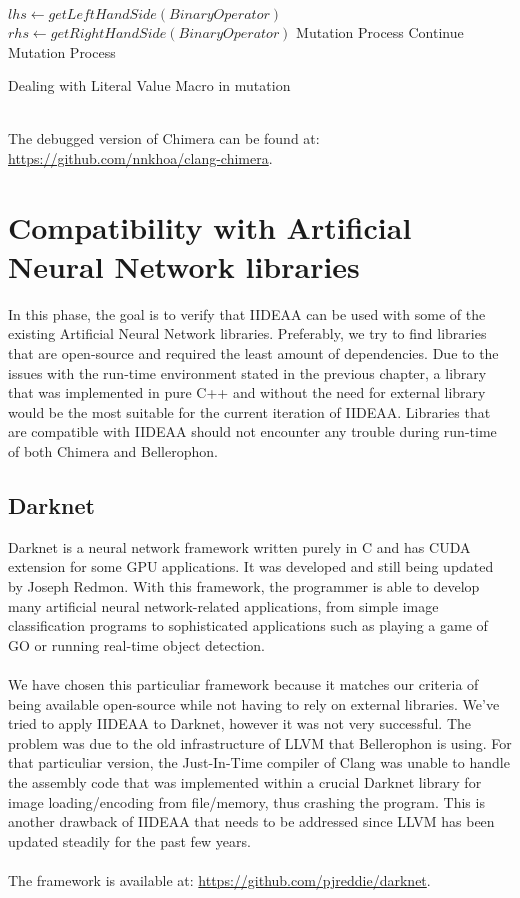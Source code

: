 \begin{algorithm}[H]
\SetAlgoLined
{}
$lhs \leftarrow getLeftHandSide(BinaryOperator)$\;
$rhs \leftarrow getRightHandSide(BinaryOperator)$\;
Mutation Process\;
Continue Mutation Process\;
\caption{Dealing with Literal Value Macro in mutation}
\end{algorithm}
~\\
The debugged version of Chimera can be found at: \url{https://github.com/nnkhoa/clang-chimera}.\\

\section{Compatibility with Artificial Neural Network libraries}

In this phase, the goal is to verify that IIDEAA can be used with some of the existing Artificial Neural Network libraries. Preferably, we try to find libraries that are open-source and required the least amount of dependencies. Due to the issues with the run-time environment stated in the previous chapter, a library that was implemented in pure C++ and without the need for external library would be the most suitable for the current iteration of IIDEAA. Libraries that are compatible with IIDEAA should not encounter any trouble during run-time of both Chimera and Bellerophon.\\

\subsection{Darknet}

Darknet\cite{darknet13} is a neural network framework written purely in C and has CUDA extension for some GPU applications. It was developed and still being updated by Joseph Redmon. With this framework, the programmer is able to develop many artificial neural network-related applications, from simple image classification programs to sophisticated applications such as playing a game of GO or running real-time object detection.\\
~\\
We have chosen this particuliar framework because it matches our criteria of being available open-source while not having to rely on external libraries. We've tried to apply IIDEAA to Darknet, however it was not very successful. The problem was due to the old infrastructure of LLVM that Bellerophon is using. For that particuliar version, the Just-In-Time compiler of Clang was unable to handle the assembly code that was implemented within a crucial Darknet library for image loading/encoding from file/memory, thus crashing the program. This is another drawback of IIDEAA that needs to be addressed since LLVM has been updated steadily for the past few years. \\
~\\
The framework is available at: \url{https://github.com/pjreddie/darknet}.\\

